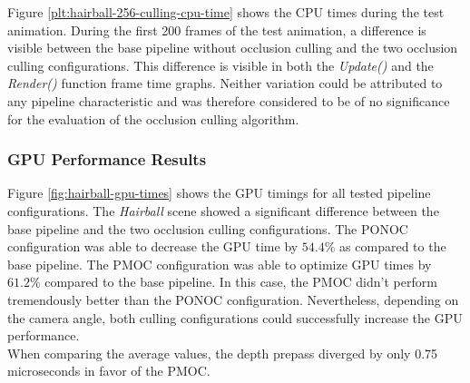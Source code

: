 \noindent
Figure \ref{plt:hairball-256-culling-cpu-time} shows the \ac{CPU} times during the test animation. During 
the first 200 frames of the test animation, a difference is visible between the base pipeline without 
occlusion culling and the two occlusion culling configurations. This difference is visible in both the 
\emph{Update()} and the \emph{Render()} function frame time graphs.
Neither variation could be attributed to any pipeline characteristic and was therefore considered to be of 
no significance for the evaluation of the occlusion culling algorithm.

\enlargethispage{\baselineskip}
\enlargethispage{\baselineskip}

\subsubsection*{GPU Performance Results} \label{subsubsec-gpu-performance-results-hairball}

Figure \ref{fig:hairball-gpu-times} shows the \ac{GPU} timings for all tested pipeline configurations.
The \emph{Hairball} scene showed a significant difference between the base pipeline and the two occlusion 
culling configurations. The \ac{PONOC} configuration was able to decrease the \ac{GPU} time by $54.4\%$ 
as compared to the base pipeline. The \ac{PMOC} configuration was able to optimize \ac{GPU} times by 
$61.2\%$ compared to the base pipeline. In this case, the \ac{PMOC} didn't perform tremendously better 
than the \ac{PONOC} configuration. Nevertheless, depending on the camera angle, both culling configurations 
could successfully increase the \ac{GPU} performance. \\

\noindent
When comparing the average values, the depth prepass diverged by only 0.75 microseconds in favor of the \ac{PMOC}.  

